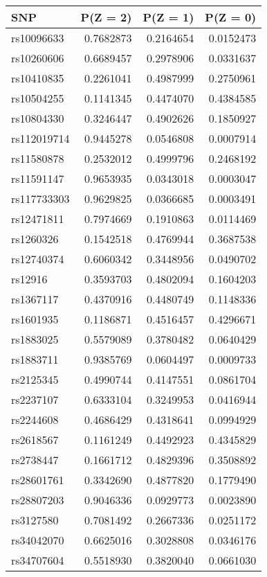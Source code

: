 \documentclass[AMA,STIX1COL,]{WileyNJD-v2}
\begin{document}
\begin{table}[ht]
\begin{minipage}{0.5\linewidth}
\begin{tabular}{lrrr}
\toprule
SNP & P(Z = 2) & P(Z = 1) & P(Z = 0)\\
\midrule
rs10096633 & 0.7682873 & 0.2164654 & 0.0152473\\
rs10260606 & 0.6689457 & 0.2978906 & 0.0331637\\
rs10410835 & 0.2261041 & 0.4987999 & 0.2750961\\
rs10504255 & 0.1141345 & 0.4474070 & 0.4384585\\
rs10804330 & 0.3246447 & 0.4902626 & 0.1850927\\
\addlinespace
rs112019714 & 0.9445278 & 0.0546808 & 0.0007914\\
rs11580878 & 0.2532012 & 0.4999796 & 0.2468192\\
rs11591147 & 0.9653935 & 0.0343018 & 0.0003047\\
rs117733303 & 0.9629825 & 0.0366685 & 0.0003491\\
rs12471811 & 0.7974669 & 0.1910863 & 0.0114469\\
\addlinespace
rs1260326 & 0.1542518 & 0.4769944 & 0.3687538\\
rs12740374 & 0.6060342 & 0.3448956 & 0.0490702\\
rs12916 & 0.3593703 & 0.4802094 & 0.1604203\\
rs1367117 & 0.4370916 & 0.4480749 & 0.1148336\\
rs1601935 & 0.1186871 & 0.4516457 & 0.4296671\\
\addlinespace
rs1883025 & 0.5579089 & 0.3780482 & 0.0640429\\
rs1883711 & 0.9385769 & 0.0604497 & 0.0009733\\
rs2125345 & 0.4990744 & 0.4147551 & 0.0861704\\
rs2237107 & 0.6333104 & 0.3249953 & 0.0416944\\
rs2244608 & 0.4686429 & 0.4318641 & 0.0994929\\
\addlinespace
rs2618567 & 0.1161249 & 0.4492923 & 0.4345829\\
rs2738447 & 0.1661712 & 0.4829396 & 0.3508892\\
rs28601761 & 0.3342690 & 0.4877820 & 0.1779490\\
rs28807203 & 0.9046336 & 0.0929773 & 0.0023890\\
rs3127580 & 0.7081492 & 0.2667336 & 0.0251172\\
\addlinespace
rs34042070 & 0.6625016 & 0.3028808 & 0.0346176\\
rs34707604 & 0.5518930 & 0.3820040 & 0.0661030\\
\bottomrule
\end{tabular}



\end{minipage}
\end{table}
\end{document}
